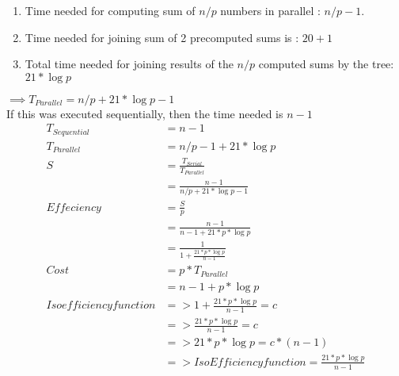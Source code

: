 \documentclass[11pt]{article}
\begin{document}
\begin{enumerate}
\begin{itemize}
\begin{enumerate}
					\item Time needed for computing sum of $n/p$ numbers in parallel : $n/p-1$.
					\item Time needed for joining sum of 2 precomputed sums is : $20+1$
					\item Total time needed for joining results of the $n/p$ computed sums by the tree: $21*\log p$
				\end{enumerate}
				$\implies T_{Parallel} = n/p + 21*\log p -1$
				\\ If this was executed sequentially, then the time needed is $n-1$ \\
				\begin{align*}
					T_{Sequential} &= n-1 \\
					T_{Parallel} &= n/p -1 + 21*\log p \\
						S &= \frac{T_{Serial}}{T_{Parallel}} \\
						&= \frac{n-1}{n/p +21*\log p -1} \\
					Effeciency &= \frac{S}{p} \\
					&= \frac{n-1}{n-1 +21*p*\log p} \\
					&= \frac{1}{1+\frac{21*p*\log p}{n-1}}\\
					Cost &= p*T_{Parallel}\\
							&=n-1+p*\log p\\
					Iso efficiency function &=> 1+ \frac{21*p*\log p}{n-1} = c\\
						&=> \frac{21*p*\log p}{n-1}= c\\
						&=> 21*p*\log p= c*(n-1)\\
						&=> Iso Efficiency function = \frac{21*p*\log p}{n-1}
				\end{align*}


	\end{itemize}







\end{enumerate}
\end{document}
